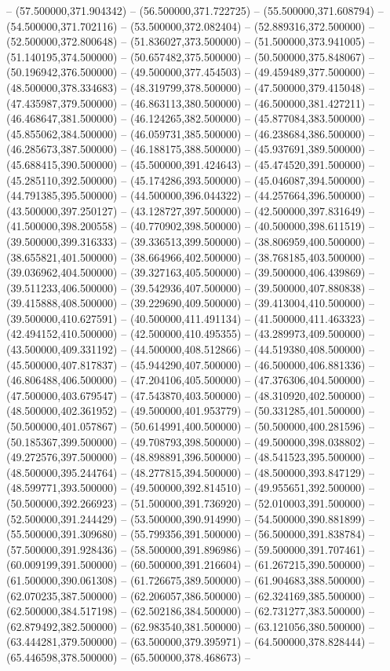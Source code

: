 -- (57.500000,371.904342) -- (56.500000,371.722725) -- (55.500000,371.608794) -- (54.500000,371.702116) -- (53.500000,372.082404) -- (52.889316,372.500000) -- (52.500000,372.800648) -- (51.836027,373.500000) -- (51.500000,373.941005) -- (51.140195,374.500000) -- (50.657482,375.500000) -- (50.500000,375.848067) -- (50.196942,376.500000) -- (49.500000,377.454503) -- (49.459489,377.500000) -- (48.500000,378.334683) -- (48.319799,378.500000) -- (47.500000,379.415048) -- (47.435987,379.500000) -- (46.863113,380.500000) -- (46.500000,381.427211) -- (46.468647,381.500000) -- (46.124265,382.500000) -- (45.877084,383.500000) -- (45.855062,384.500000) -- (46.059731,385.500000) -- (46.238684,386.500000) -- (46.285673,387.500000) -- (46.188175,388.500000) -- (45.937691,389.500000) -- (45.688415,390.500000) -- (45.500000,391.424643) -- (45.474520,391.500000) -- (45.285110,392.500000) -- (45.174286,393.500000) -- (45.046087,394.500000) -- (44.791385,395.500000) -- (44.500000,396.044322) -- (44.257664,396.500000) -- (43.500000,397.250127) -- (43.128727,397.500000) -- (42.500000,397.831649) -- (41.500000,398.200558) -- (40.770902,398.500000) -- (40.500000,398.611519) -- (39.500000,399.316333) -- (39.336513,399.500000) -- (38.806959,400.500000) -- (38.655821,401.500000) -- (38.664966,402.500000) -- (38.768185,403.500000) -- (39.036962,404.500000) -- (39.327163,405.500000) -- (39.500000,406.439869) -- (39.511233,406.500000) -- (39.542936,407.500000) -- (39.500000,407.880838) -- (39.415888,408.500000) -- (39.229690,409.500000) -- (39.413004,410.500000) -- (39.500000,410.627591) -- (40.500000,411.491134) -- (41.500000,411.463323) -- (42.494152,410.500000) -- (42.500000,410.495355) -- (43.289973,409.500000) -- (43.500000,409.331192) -- (44.500000,408.512866) -- (44.519380,408.500000) -- (45.500000,407.817837) -- (45.944290,407.500000) -- (46.500000,406.881336) -- (46.806488,406.500000) -- (47.204106,405.500000) -- (47.376306,404.500000) -- (47.500000,403.679547) -- (47.543870,403.500000) -- (48.310920,402.500000) -- (48.500000,402.361952) -- (49.500000,401.953779) -- (50.331285,401.500000) -- (50.500000,401.057867) -- (50.614991,400.500000) -- (50.500000,400.281596) -- (50.185367,399.500000) -- (49.708793,398.500000) -- (49.500000,398.038802) -- (49.272576,397.500000) -- (48.898891,396.500000) -- (48.541523,395.500000) -- (48.500000,395.244764) -- (48.277815,394.500000) -- (48.500000,393.847129) -- (48.599771,393.500000) -- (49.500000,392.814510) -- (49.955651,392.500000) -- (50.500000,392.266923) -- (51.500000,391.736920) -- (52.010003,391.500000) -- (52.500000,391.244429) -- (53.500000,390.914990) -- (54.500000,390.881899) -- (55.500000,391.309680) -- (55.799356,391.500000) -- (56.500000,391.838784) -- (57.500000,391.928436) -- (58.500000,391.896986) -- (59.500000,391.707461) -- (60.009199,391.500000) -- (60.500000,391.216604) -- (61.267215,390.500000) -- (61.500000,390.061308) -- (61.726675,389.500000) -- (61.904683,388.500000) -- (62.070235,387.500000) -- (62.206057,386.500000) -- (62.324169,385.500000) -- (62.500000,384.517198) -- (62.502186,384.500000) -- (62.731277,383.500000) -- (62.879492,382.500000) -- (62.983540,381.500000) -- (63.121056,380.500000) -- (63.444281,379.500000) -- (63.500000,379.395971) -- (64.500000,378.828444) -- (65.446598,378.500000) -- (65.500000,378.468673) -- 